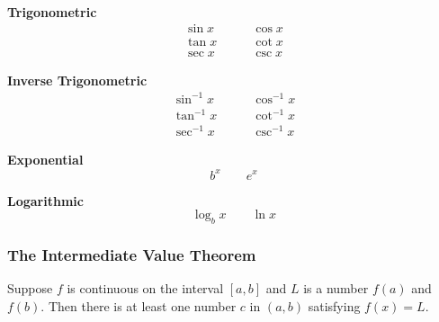 \noindent\textbf{Trigonometric}
\begin{align}
    \sin x &\qquad \cos x \\
    \tan x &\qquad \cot x \\
    \sec x &\qquad \csc x 
\end{align}

\noindent\textbf{Inverse Trigonometric}
\begin{align}
    \sin^{-1} x &\qquad \cos^{-1} x \\
    \tan^{-1} x &\qquad \cot^{-1} x \\
    \sec^{-1} x &\qquad \csc^{-1} x
\end{align}

\noindent\textbf{Exponential}
\begin{equation}
    b^x \qquad e^x
\end{equation}

\noindent\textbf{Logarithmic}
\begin{equation}
    \log_b x \qquad \ln x
\end{equation}

\subsubsection{The Intermediate Value Theorem}
Suppose $f$ is continuous on the interval $[a, b]$ and $L$ is a number $f(a)$ and $f(b)$. Then there is at least one number $c$ in $(a, b)$ satisfying $f(x) = L$.
